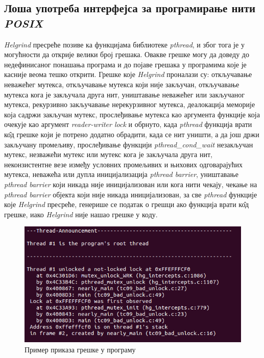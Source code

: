 \documentclass[12pt,oneside]{memoir}
\begin{document}
\subsection{Лоша употреба интерфејса за програмирање нити \textit{POSIX}}

\indent \textit{Helgrind} пресреће позиве ка функцијама библиотеке \textit{pthread}, и због тога је у могућности да открије велики број грешака. Овакве грешке могу да доведу до недефинисаног понашања програма и до појаве грешака у програмима које је касније веома тешко открити. Грешке које \textit{Helgrind} проналази су: откључавање неважећег мутекса, откључавање мутекса који није закључан, откључавање мутекса кога је закључала друга нит, уништавање неважећег или закључаног мутекса, рекурзивно закључавање нерекурзивног мутекса, деалокација меморије која садржи закључан мутекс, прослеђивање мутекса као аргумента функције која очекује као аргумент  \textit{reader-writer lock} и обрнуто, када \textit{pthread} функција врати к\^{о}д грешке који је потрено додатно обрадити, када се нит уништи, а да још држи закључану промељиву, прослеђивање функцији \textit{pthread\_cond\_wait} незакључан мутекс, незважећи мутекс или мутекс кога је закључала друга нит, неконзистентне везе између условних промељивих и њихових одговарајућих мутекса, неважећа или дупла иницијализација \textit{pthread barrier}, уништавање \textit{pthread barrier} који никада није иницијализован или кога нити чекају, чекање на \textit{pthread barrier} објекта који није никада иницијализован, за све \textit{pthread} функције које \textit{Helgrind} пресреће, генерише се податак о грешци ако функција врати к\^{о}д грешке, иако \textit{Helgrind} није нашао грешке у коду.

\begin{figure}[h!]
\begin{center}
\includegraphics[scale=0.75]{slika13.png}
\end{center}
\caption{Пример приказа грешке у програму}
\label{fig:helgrind}
\end{figure}
\end{document}
